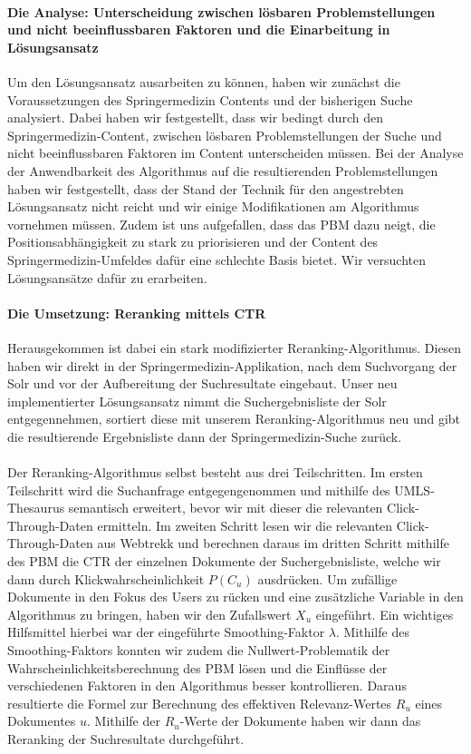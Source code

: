 \paragraph{Die Analyse: Unterscheidung zwischen lösbaren Problemstellungen und nicht beeinflussbaren Faktoren und die Einarbeitung in Lösungsansatz}
Um den Lösungsansatz ausarbeiten zu können, haben wir zunächst die Voraussetzungen des Springermedizin Contents und der bisherigen Suche analysiert. Dabei haben wir festgestellt, dass wir bedingt durch den Springermedizin-Content, zwischen lösbaren Problemstellungen der Suche und nicht beeinflussbaren Faktoren im Content unterscheiden müssen. Bei der Analyse der Anwendbarkeit des Algorithmus auf die resultierenden Problemstellungen haben wir festgestellt, dass der Stand der Technik für den angestrebten Lösungsansatz nicht reicht und wir einige Modifikationen am Algorithmus vornehmen müssen. Zudem ist uns aufgefallen, dass das PBM dazu neigt, die Positionsabhängigkeit zu stark zu priorisieren und der Content des Springermedizin-Umfeldes dafür eine schlechte Basis bietet. Wir versuchten Lösungsansätze dafür zu erarbeiten.

\paragraph{Die Umsetzung: Reranking mittels CTR}
Herausgekommen ist dabei ein stark modifizierter Reranking-Algorithmus. Diesen haben wir direkt in der Springermedizin-Applikation, nach dem Suchvorgang der Solr und vor der Aufbereitung der Suchresultate eingebaut. Unser neu implementierter Lösungsansatz nimmt die Suchergebnisliste der Solr entgegennehmen, sortiert diese mit unserem Reranking-Algorithmus neu und gibt die resultierende Ergebnisliste dann der Springermedizin-Suche zurück. 
\\
\\
Der Reranking-Algorithmus selbst besteht aus drei Teilschritten. Im ersten Teilschritt wird die Suchanfrage entgegengenommen und mithilfe des UMLS-Thesaurus semantisch erweitert, bevor wir mit dieser die relevanten Click-Through-Daten ermitteln. Im zweiten Schritt lesen wir die relevanten Click-Through-Daten aus Webtrekk und berechnen daraus im dritten Schritt mithilfe des PBM die CTR der einzelnen Dokumente der Suchergebnisliste, welche wir dann durch Klickwahrscheinlichkeit $P(C_{u})$ ausdrücken. Um zufällige Dokumente in den Fokus des Users zu rücken und eine zusätzliche Variable in den Algorithmus zu bringen, haben wir den Zufallswert $X_u$ eingeführt. Ein wichtiges Hilfsmittel hierbei war der eingeführte Smoothing-Faktor $\lambda$. Mithilfe des Smoothing-Faktors konnten wir zudem die Nullwert-Problematik der Wahrscheinlichkeitsberechnung des PBM lösen und die Einflüsse der verschiedenen Faktoren in den Algorithmus besser kontrollieren. Daraus resultierte die Formel zur Berechnung des effektiven Relevanz-Wertes  $R_u$ eines Dokumentes $u$. Mithilfe der $R_u$-Werte der Dokumente haben wir dann das Reranking der Suchresultate durchgeführt.

